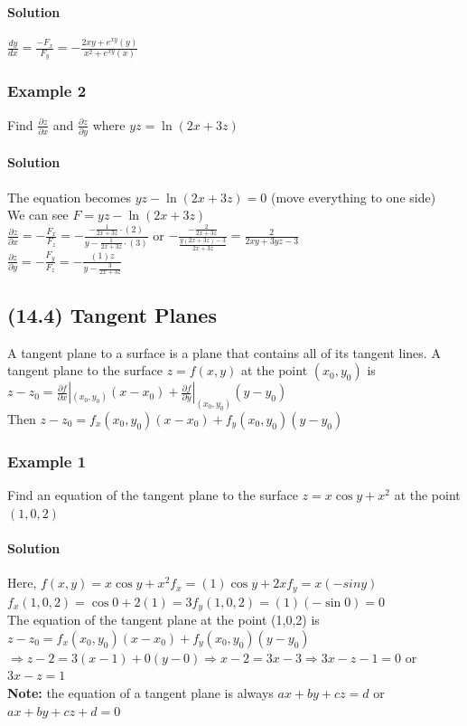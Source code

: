 \documentclass{article}
\newcommand{\p}{\partial}
\begin{document}
\paragraph{Solution} $\frac{dy}{dx}=\frac{-F_x}{F_y}=-\frac{2xy+e^{xy}(y)}{x^2+e^{xy}(x)}$

\subsubsection{Example 2} Find $\frac{\p z}{\p x}$ and $\frac{\p z}{\p y}$ where $yz=\ln(2x+3z)$
\paragraph{Solution} The equation becomes $yz-\ln(2x+3z)=0$ (move everything to one side)
\\We can see $F=yz-\ln(2x+3z)$
\\$\frac{\p z}{\p x}=-\frac{F_x}{F_z}=-\frac{-\frac{1}{2x+3z}\cdot(2)}{y-\frac{1}{2x+3z}\cdot(3)}$
or $-\frac{-\frac{2}{2x+3z}}{\frac{y(2x+3z)-3}{2x+3z}}=\frac{2}{2xy+3yz-3}$
\\$\frac{\p z}{\p y}=-\frac{F_y}{F_z}=-\frac{(1)z}{y-\frac{3}{2x+3z}}$

\subsection{(14.4) Tangent Planes}
A tangent plane to a surface is a plane that contains all of its tangent lines. A tangent plane to the surface $z=f(x,y)$
at the point $(x_0,y_0)$ is $z-z_0=\frac{\p f}{\p x}|_{(x_0,y_0)}(x-x_0)+\frac{\p f}{\p y}|_{(x_0,y_0)}(y-y_0)$
\\Then $z-z_0=f_x(x_0,y_0)(x-x_0)+f_y(x_0,y_0)(y-y_0)$

\subsubsection{Example 1}
Find an equation of the tangent plane to the surface $z=x\cos{y}+x^2$ at the point $(1,0,2)$
\paragraph{Solution} Here, $f(x,y)=x\cos{y}+x^2$\qquad$f_x=(1)\cos{y}+2x$\qquad$f_y=x(-sin{y})$
\\$f_x(1,0,2)=\cos0+2(1)=3$\qquad$f_y(1,0,2)=(1)(-\sin0)=0$
\\The equation of the tangent plane at the point (1,0,2) is $z-z_0=f_x(x_0,y_0)(x-x_0)+f_y(x_0,y_0)(y-y_0)$
\\$\Rightarrow z-2=3(x-1)+0(y-0)\Rightarrow x-2=3x-3\Rightarrow 3x-z-1=0$ or $3x-z=1$
\\\textbf{Note:} the equation of a tangent plane is always $ax+by+cz=d$ or $ax+by+cz+d=0$
\end{document}
